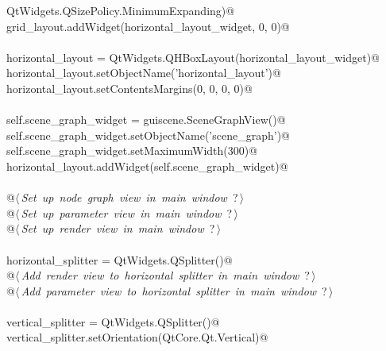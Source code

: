 \documentclass[
    a4paper,      %
    10pt,         %
    openright,    %
    notitlepage,  %
    parskip=half, %
]{scrreprt}       %
\theoremstyle{definition}                    %
\begin{document}
\begin{flushleft}
\begin{minipage}{\linewidth}
\begin{list}{}{}
\mbox{}\lstinline@    QtWidgets.QSizePolicy.MinimumExpanding)@\\
\mbox{}\lstinline@    grid_layout.addWidget(horizontal_layout_widget, 0, 0)@\\
\mbox{}\lstinline@@\\
\mbox{}\lstinline@    horizontal_layout = QtWidgets.QHBoxLayout(horizontal_layout_widget)@\\
\mbox{}\lstinline@    horizontal_layout.setObjectName('horizontal_layout')@\\
\mbox{}\lstinline@    horizontal_layout.setContentsMargins(0, 0, 0, 0)@\\
\mbox{}\lstinline@@\\
\mbox{}\lstinline@    self.scene_graph_widget = guiscene.SceneGraphView()@\\
\mbox{}\lstinline@    self.scene_graph_widget.setObjectName('scene_graph')@\\
\mbox{}\lstinline@    self.scene_graph_widget.setMaximumWidth(300)@\\
\mbox{}\lstinline@    horizontal_layout.addWidget(self.scene_graph_widget)@\\
\mbox{}\lstinline@@\\
\mbox{}\lstinline@    @\hbox{$\langle\,${\itshape Set up node graph view in main window}\nobreak\ {\footnotesize ?}$\,\rangle$}\lstinline@@\\
\mbox{}\lstinline@    @\hbox{$\langle\,${\itshape Set up parameter view in main window}\nobreak\ {\footnotesize ?}$\,\rangle$}\lstinline@@\\
\mbox{}\lstinline@    @\hbox{$\langle\,${\itshape Set up render view in main window}\nobreak\ {\footnotesize ?}$\,\rangle$}\lstinline@@\\
\mbox{}\lstinline@@\\
\mbox{}\lstinline@     horizontal_splitter = QtWidgets.QSplitter()@\\
\mbox{}\lstinline@    @\hbox{$\langle\,${\itshape Add render view to horizontal splitter in main window}\nobreak\ {\footnotesize ?}$\,\rangle$}\lstinline@@\\
\mbox{}\lstinline@    @\hbox{$\langle\,${\itshape Add parameter view to horizontal splitter in main window}\nobreak\ {\footnotesize ?}$\,\rangle$}\lstinline@@\\
\mbox{}\lstinline@@\\
\mbox{}\lstinline@     vertical_splitter = QtWidgets.QSplitter()@\\
\mbox{}\lstinline@    vertical_splitter.setOrientation(QtCore.Qt.Vertical)@\\

\end{list}
\end{minipage}
\end{flushleft}
\end{document}
